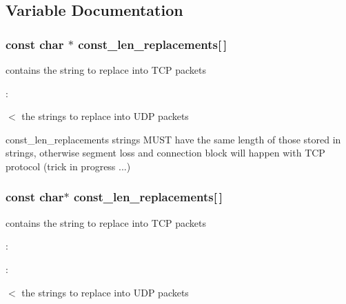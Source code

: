 \subsection{Variable Documentation}
\hypertarget{group__Extern__Declarations_gadcba2a878c84b367279910363410c587}{
\subsubsection[{const\_\-len\_\-replacements}]{\setlength{\rightskip}{0pt plus 5cm}const char $\ast$ {\bf const\_\-len\_\-replacements}\mbox{[}$\,$\mbox{]}}}
\label{group__Extern__Declarations_gadcba2a878c84b367279910363410c587}


contains the string to replace into TCP packets 

:

$<$ the strings to replace into UDP packets

const\_\-len\_\-replacements strings MUST have the same length of those stored in strings, otherwise segment loss and connection block will happen with TCP protocol (trick in progress ...) \hypertarget{group__Extern__Declarations_ga91ad013799247b2cd1330f1771d83cd9}{
\subsubsection[{const\_\-len\_\-replacements}]{\setlength{\rightskip}{0pt plus 5cm}const char$\ast$ {\bf const\_\-len\_\-replacements}\mbox{[}$\,$\mbox{]}}}
\label{group__Extern__Declarations_ga91ad013799247b2cd1330f1771d83cd9}


contains the string to replace into TCP packets 

:

:

$<$ the strings to replace into UDP packets

